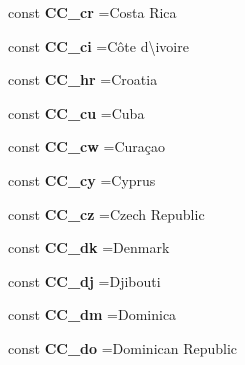 \begin{DoxyCompactItemize}
const {\bfseries C\+C\+\_\+cr} =\textquotesingle{}Costa Rica\textquotesingle{}
\item 
\hypertarget{class_i_s_o_ab006b23a2f0e2ed45526649b360a2be5}{}\label{class_i_s_o_ab006b23a2f0e2ed45526649b360a2be5} 
const {\bfseries C\+C\+\_\+ci} =\textquotesingle{}Côte d\textbackslash{}\textquotesingle{}ivoire\textquotesingle{}
\item 
\hypertarget{class_i_s_o_a1773e8096f494a8b628f2f5ff846a0f8}{}\label{class_i_s_o_a1773e8096f494a8b628f2f5ff846a0f8} 
const {\bfseries C\+C\+\_\+hr} =\textquotesingle{}Croatia\textquotesingle{}
\item 
\hypertarget{class_i_s_o_a741c61ed8566d0241e8e063474b550ac}{}\label{class_i_s_o_a741c61ed8566d0241e8e063474b550ac} 
const {\bfseries C\+C\+\_\+cu} =\textquotesingle{}Cuba\textquotesingle{}
\item 
\hypertarget{class_i_s_o_a95b8cd68df739d664d3a6d98eab7b984}{}\label{class_i_s_o_a95b8cd68df739d664d3a6d98eab7b984} 
const {\bfseries C\+C\+\_\+cw} =\textquotesingle{}Curaçao\textquotesingle{}
\item 
\hypertarget{class_i_s_o_a9acbeb0b305b934c05281d027430e31b}{}\label{class_i_s_o_a9acbeb0b305b934c05281d027430e31b} 
const {\bfseries C\+C\+\_\+cy} =\textquotesingle{}Cyprus\textquotesingle{}
\item 
\hypertarget{class_i_s_o_af24e16eeaa685d46abe8eab8a05168f1}{}\label{class_i_s_o_af24e16eeaa685d46abe8eab8a05168f1} 
const {\bfseries C\+C\+\_\+cz} =\textquotesingle{}Czech Republic\textquotesingle{}
\item 
\hypertarget{class_i_s_o_a1e5317ca593c736f8a7cef19b9bb5bfd}{}\label{class_i_s_o_a1e5317ca593c736f8a7cef19b9bb5bfd} 
const {\bfseries C\+C\+\_\+dk} =\textquotesingle{}Denmark\textquotesingle{}
\item 
\hypertarget{class_i_s_o_a1c7208361eff7f779c19f2cf45ccdf69}{}\label{class_i_s_o_a1c7208361eff7f779c19f2cf45ccdf69} 
const {\bfseries C\+C\+\_\+dj} =\textquotesingle{}Djibouti\textquotesingle{}
\item 
\hypertarget{class_i_s_o_a3efc4265bd8aca9b164842796b5d18f2}{}\label{class_i_s_o_a3efc4265bd8aca9b164842796b5d18f2} 
const {\bfseries C\+C\+\_\+dm} =\textquotesingle{}Dominica\textquotesingle{}
\item 
\hypertarget{class_i_s_o_ae350d60437ad4949995333d579568152}{}\label{class_i_s_o_ae350d60437ad4949995333d579568152} 
const {\bfseries C\+C\+\_\+do} =\textquotesingle{}Dominican Republic\textquotesingle{}
\item 
\hypertarget{class_i_s_o_a02598ef966b443617c3efaeb4943fa82}{}\label{class_i_s_o_a02598ef966b443617c3efaeb4943fa82} 

\end{DoxyCompactItemize}
